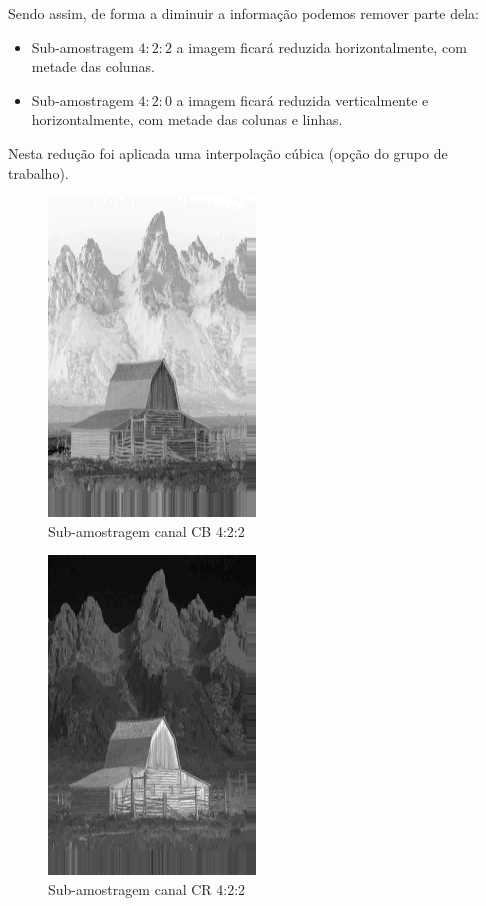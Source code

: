 \documentclass[a4paper, 12pt]{article}
\begin{document}
    Sendo assim, de forma a diminuir a informação podemos remover parte dela:
    \begin{itemize}
        \item Sub-amostragem $4:2:2$ a imagem ficará reduzida horizontalmente, com metade das 
    colunas.
        \item Sub-amostragem $4:2:0$ a imagem ficará reduzida verticalmente e horizontalmente, 
    com metade das colunas e linhas.
    \end{itemize}
    
    Nesta redução foi aplicada uma interpolação cúbica (opção do grupo de trabalho).

        \begin{multicols}{2}
            \begin{figure}[H]
                \centering
                \includegraphics[scale=1]{resources/Sampling/CB_422.png}
                \caption{\label{fig:my_label} Sub-amostragem canal CB 4:2:2}
            \end{figure}
            \begin{figure}[H]
                \centering
                \includegraphics[scale=1]{resources/Sampling/CR_422.png}
                \caption{\label{fig:my_label} Sub-amostragem canal CR 4:2:2}
            \end{figure}
        \end{multicols}
\end{document}
